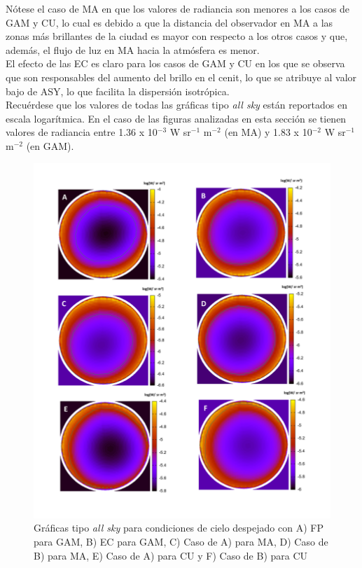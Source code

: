 Nótese el caso de MA en que los valores de radiancia son menores a los casos de GAM y CU, lo cual es debido a que la distancia del observador en MA a las zonas más brillantes de la ciudad es mayor con respecto a los otros casos y que, además, el flujo de luz en MA hacia la atmósfera es menor.\\

El efecto de las EC es claro para los casos de GAM y CU en los que se observa que son responsables del aumento del brillo en el cenit, lo que se atribuye al valor bajo de ASY, lo que facilita la dispersión isotrópica.\\

Recuérdese que los valores de todas las gráficas tipo \textit{all sky} están reportados en escala logarítmica. En el caso de las figuras analizadas en esta sección se tienen valores de radiancia entre 1.36 x 10$^{-3}$ W sr$^{-1}$ m$^{-2}$ (en MA) y 1.83 x 10$^{-2}$ W sr$^{-1}$ m$^{-2}$ (en GAM).\\

\newpage

\begin{figure}[H]
  \centering
    \includegraphics[width=1\textwidth]{1}
  \caption{Gráficas tipo \textit{all sky} para condiciones de cielo despejado con A) FP para GAM, B) EC para GAM, C) Caso de A) para MA, D) Caso de B) para MA, E) Caso de A) para CU y F) Caso de B) para CU} 
  \label{1}
\end{figure}


